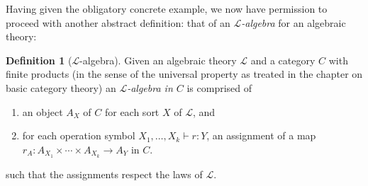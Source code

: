 \documentclass[12pt,twoside]{reedthesis}
\theoremstyle{definition}
\newtheorem{definition}{Definition}
\theoremstyle{remark}
\theoremstyle{theorem}
\begin{document}
Having given the obligatory concrete example, we now have permission to proceed
with another abstract definition: that of an \emph{$\mathcal{L}$-algebra} for an
algebraic theory:

\begin{definition}[$\mathcal{L}$-algebra]\label{def:algebra}
  Given an algebraic theory $\mathcal{L}$ and a category $C$ with finite
  products (in the sense of the universal property as treated in the chapter on
  basic category theory) an \emph{$\mathcal{L}$-algebra in $C$} is comprised of
  \begin{enumerate}
    \item an object $A_{X}$ of $C$ for each sort $X$ of $\mathcal{L}$, and
    \item for each operation symbol $X_{1}, \dots , X_{k} \vdash r : Y$, an
          assignment of a map \(r_{A} : A_{X_{1}} \times \cdots \times A_{X_{k}} \rightarrow A_{Y}\) in
          $C$.
  \end{enumerate}
  such that the assignments respect the laws of $\mathcal{L}$.
\end{definition}
\end{document}
